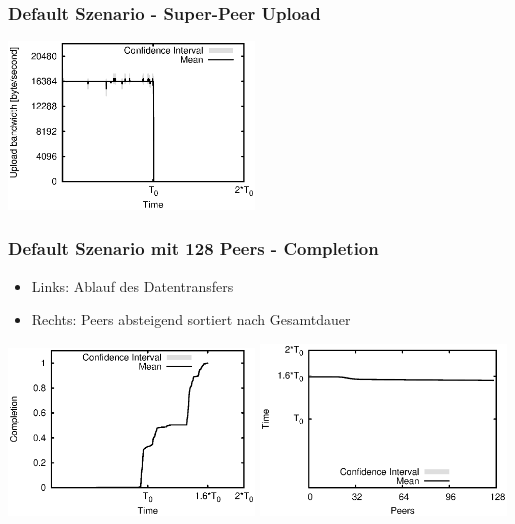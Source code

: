 \begin{frame}
  \frametitle{Default Szenario - Super-Peer Upload}
  \begin{center}
    \includegraphics[width=0.49\textwidth]{fig/plots/scenario_1_default/plots/GeneratedMeanCurrentSuperSeederUploadBandwidth.csv.eps}
  \end{center}
\end{frame}


\begin{frame}
  \frametitle{Default Szenario mit 128 Peers - Completion}
  \begin{itemize}  
    \item Links: Ablauf des Datentransfers
    \item Rechts: Peers absteigend sortiert nach Gesamtdauer
  \end{itemize}

  \begin{center}
    \includegraphics[width=0.49\textwidth]{fig/plots/scenario_4_peer_count_128/plots/GeneratedMeanChunkCompletion.csv.eps}
    \hfill
    \includegraphics[width=0.49\textwidth]{fig/plots/scenario_4_peer_count_128/plots/GeneratedMeanSortedChunkCompletion.csv.eps}
  \end{center}
\end{frame}


